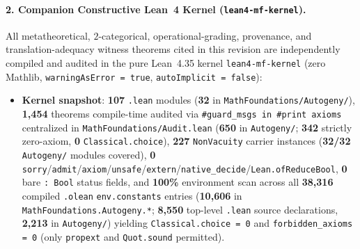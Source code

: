 \documentclass[11pt]{article}
\theoremstyle{plain}
\theoremstyle{definition}
\begin{document}
\paragraph{2. Companion Constructive Lean~4 Kernel (\texttt{lean4-mf-kernel}).}
All metatheoretical, $2$-categorical, operational-grading, provenance, and translation-adequacy witness theorems cited in this revision are independently compiled and audited in the pure Lean~4.35 kernel \texttt{lean4-mf-kernel} (zero Mathlib, \texttt{warningAsError = true}, \texttt{autoImplicit = false}):
\begin{itemize}[nosep]
\item \textbf{Kernel snapshot}: \textbf{107} \texttt{.lean} modules (\textbf{32} in \texttt{MathFoundations/\allowbreak Autogeny/}), \textbf{1{,}454} theorems compile-time audited via \texttt{\#guard\_msgs in \#print axioms} centralized in \texttt{MathFoundations/\allowbreak Audit.lean} (\textbf{650} in \texttt{Autogeny/}; \textbf{342} strictly zero-axiom, \textbf{0} \texttt{Classical.choice}), \textbf{227} \texttt{NonVacuity} carrier instances (\textbf{32/32} \texttt{Autogeny/} modules covered), \textbf{0} \texttt{sorry}/\texttt{admit}/\texttt{axiom}/\texttt{unsafe}/\texttt{extern}/\texttt{native\_decide}/\texttt{Lean.ofReduceBool}, \textbf{0} bare \texttt{: Bool} status fields, and \textbf{100\%} environment scan across all \textbf{38{,}316} compiled \texttt{.olean} \texttt{env.constants} entries (\textbf{10{,}606} in \texttt{MathFoundations.\allowbreak Autogeny.*}; \textbf{8{,}550} top-level \texttt{.lean} source declarations, \textbf{2{,}213} in \texttt{Autogeny/}) yielding \texttt{Classical.choice = 0} and \texttt{forbidden\_axioms = 0} (only \texttt{propext} and \texttt{Quot.sound} permitted).

\end{itemize}
\end{document}
